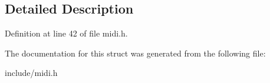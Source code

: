 \subsection{Detailed Description}


Definition at line 42 of file midi.\-h.



The documentation for this struct was generated from the following file\-:\begin{DoxyCompactItemize}
\item 
include/midi.\-h\end{DoxyCompactItemize}
